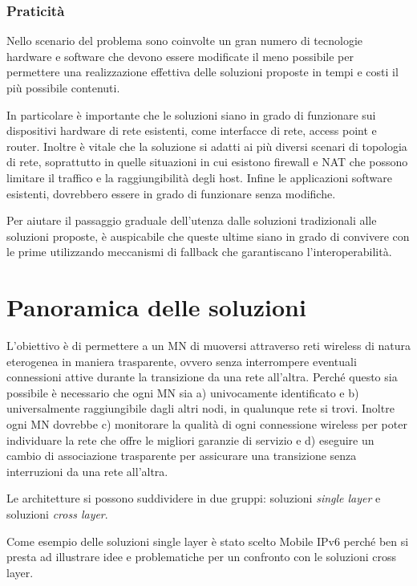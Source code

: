 \documentclass[12pt,a4paper,openright,twoside]{book}
\begin{document}
\subsection{Praticità}
\label{sec:praticita}
Nello scenario del problema sono coinvolte un gran numero di
tecnologie hardware e software che devono essere modificate il meno
possibile per permettere una realizzazione effettiva delle soluzioni
proposte in tempi e costi il più possibile contenuti.

In particolare è importante che le soluzioni siano in grado di
funzionare sui dispositivi hardware di rete esistenti, come interfacce
di rete, access point e router. Inoltre è vitale che la soluzione si
adatti ai più diversi scenari di topologia di rete, soprattutto in
quelle situazioni in cui esistono firewall e NAT che possono limitare
il traffico e la raggiungibilità degli host. Infine le applicazioni
software esistenti, dovrebbero essere in grado di funzionare senza
modifiche.

Per aiutare il passaggio graduale dell'utenza dalle soluzioni
tradizionali alle soluzioni proposte, è auspicabile che queste ultime
siano in grado di convivere con le prime utilizzando meccanismi di
fallback che garantiscano l'interoperabilità.

\clearpage{\pagestyle{empty}\cleardoublepage}

\chapter{Panoramica delle soluzioni}
\lhead[\fancyplain{}{\bfseries\thepage}]{\fancyplain{}{\bfseries\rightmark}}
L'obiettivo è di permettere a un MN di muoversi attraverso reti
wireless di natura eterogenea in maniera trasparente, ovvero senza
interrompere eventuali connessioni attive durante la transizione da
una rete all'altra. Perché questo sia possibile è necessario che ogni
MN sia a) univocamente identificato e b) universalmente raggiungibile
dagli altri nodi, in qualunque rete si trovi. Inoltre ogni MN dovrebbe
c) monitorare la qualità di ogni connessione wireless per poter
individuare la rete che offre le migliori garanzie di servizio e d)
eseguire un cambio di associazione trasparente per assicurare una
transizione senza interruzioni da una rete all'altra.

Le architetture si possono suddividere in due gruppi: soluzioni
\emph{single layer} e soluzioni \emph{cross layer}.

Come esempio delle soluzioni single layer è stato scelto Mobile IPv6
perché ben si presta ad illustrare idee e problematiche per un
confronto con le soluzioni cross layer.
\end{document}
